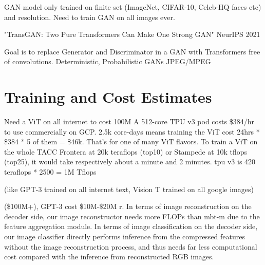 GAN model only trained on finite set (ImageNet, CIFAR-10, Celeb-HQ faces etc) and resolution.
Need to train GAN on all images ever.

"TransGAN: Two Pure Transformers Can Make One Strong GAN" \citep{jiang2021transgan}
NeurIPS 2021

Goal is to replace Generator and Discriminator in a GAN with Transformers free of 
convolutions. 
Deterministic, Probabilistic
GANs
JPEG/MPEG

\section{Training and Cost Estimates}

Need a ViT on all internet to cost 100M
A 512-core TPU v3 pod costs \$384/hr to use commercially on GCP. 
2.5k core-days means training the ViT cost 24hrs * \$384 * 5 of them = \$46k. 
That's for one of many ViT flavors.
To train a ViT on the whole TACC Frontera at 20k teraflops (top10) or 
Stampede at 10k tflops (top25), it would take respectively about a minute and 2 minutes.
tpu v3 is 420 teraflops * 2500 = 1M Tflops

(like GPT-3 trained on all internet text, Vision T trained on all google images)

(\$100M+), GPT-3 cost \$10M-\$20M
r. In terms of image reconstruction on the decoder side, our image reconstructor needs more
FLOPs than mbt-m due to the feature aggregation module. In
terms of image classification on the decoder side, our image
classifier directly performs inference from the compressed
features without the image reconstruction process, and thus
needs far less computational cost compared with the inference from reconstructed RGB images.
